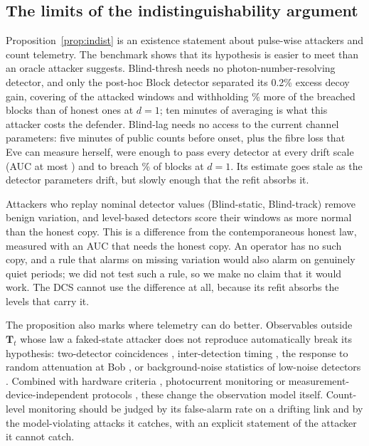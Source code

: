 \subsection{The limits of the indistinguishability argument}
Proposition~\ref{prop:indist} is an existence statement about pulse-wise attackers and count telemetry. The benchmark shows that its hypothesis is easier to meet than an oracle attacker suggests. Blind-thresh needs no photon-number-resolving detector, and only the post-hoc Block detector separated its 0.2\% excess decoy gain, covering \tprThreshBlockDOne{} of the attacked windows and withholding \exwThreshBlockDOne\% more of the breached blocks than of honest ones at $d=1$; ten minutes of averaging is what this attacker costs the defender. Blind-lag needs no access to the current channel parameters: five minutes of public counts before onset, plus the fibre loss that Eve can measure herself, were enough to pass every detector at every drift scale (AUC at most \aucLagMax) and to breach \breachLagDOne\% of blocks at $d=1$. Its estimate goes stale as the detector parameters drift, but slowly enough that the refit absorbs it.

Attackers who replay nominal detector values (Blind-static, Blind-track) remove benign variation, and level-based detectors score their windows as more normal than the honest copy. This is a difference from the contemporaneous honest law, measured with an AUC that needs the honest copy. An operator has no such copy, and a rule that alarms on missing variation would also alarm on genuinely quiet periods; we did not test such a rule, so we make no claim that it would work. The DCS cannot use the difference at all, because its refit absorbs the levels that carry it.

The proposition also marks where telemetry can do better. Observables outside $\mathbf{T}_t$ whose law a faked-state attacker does not reproduce automatically break its hypothesis: two-detector coincidences \cite{gras2021}, inter-detection timing \cite{dasilva2012}, the response to random attenuation at Bob \cite{qian2019}, or background-noise statistics of low-noise detectors \cite{lee2016}. Combined with hardware criteria \cite{koehlersidki2018}, photocurrent monitoring \cite{yuan2010} or measurement-device-independent protocols \cite{lo2012}, these change the observation model itself. Count-level monitoring should be judged by its false-alarm rate on a drifting link and by the model-violating attacks it catches, with an explicit statement of the attacker it cannot catch.

